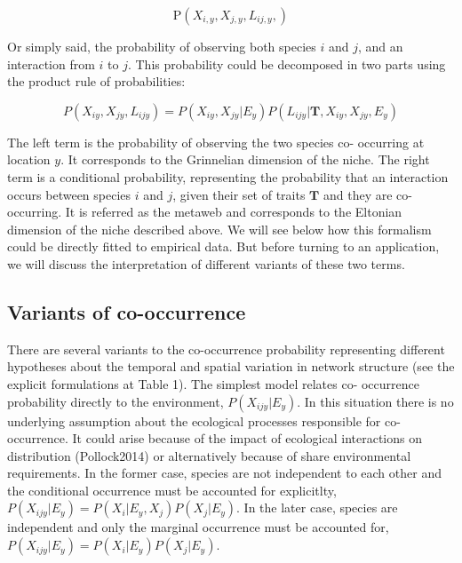 \documentclass[12pt]{article}
\begin{document}
\begin{equation}
\text{P}(X_{i,y},X_{j,y},L_{ij,y},)
\end{equation}

Or simply said, the probability of observing both species $i$ and $j$, and
an interaction from $i$ to $j$. This probability could be decomposed
in two parts using the product rule of probabilities:

\begin{equation}
P(X_{iy},X_{jy},L_{ijy})=P(X_{iy},X_{jy}|E_y)P(L_{ijy}|\mathbf{T},X_{iy},X_{jy},E_y)
\end{equation}

The left term is the probability of observing the two species co- occurring at
location $y$. It corresponds to the Grinnelian dimension of the niche. The
right term is a conditional probability, representing the probability that an
interaction occurs between species $i$ and $j$, given their set of traits
$\mathbf{T}$ and they are co- occurring. It is referred as the metaweb and
corresponds to the Eltonian dimension of the niche described above. We will
see below how this formalism could be directly fitted to empirical data. But
before turning to an application, we will discuss the interpretation of
different variants of these two terms.

\subsection*{Variants of co-occurrence}

There are several variants to the co-occurrence probability representing
different hypotheses about the temporal and spatial variation in network
structure (see the explicit formulations at Table 1). The simplest model
relates co- occurrence probability directly to the environment, $P(X_{ijy} |
E_y)$. In this situation there is no underlying assumption about the
ecological processes responsible for co-occurrence. It could arise because of
the impact of ecological interactions on distribution (Pollock2014) or
alternatively because of share environmental requirements. In the former case,
species are not independent to each other and the conditional occurrence must
be accounted for explicitlty, $P(X_{ijy} | E_y) = P(X_i | E_y, X_j)P(X_j |
E_y)$. In the later case, species are independent and only the marginal
occurrence must be accounted for, $P(X_{ijy} | E_y) = P(X_i | E_y)P(X_j |
E_y)$.
\end{document}
